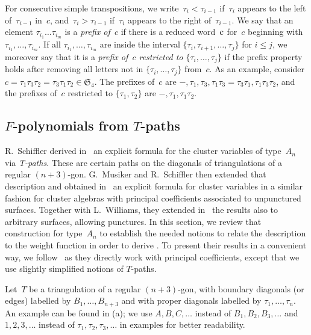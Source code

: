 \documentclass[ALCO,Unicode,ThmDefs]{cedram}
\newcommand{\Sym}{{\mathfrak{S}}}
\newcommand{\Dfn}[1]{\emph{#1}}
\newcommand{\sq}[1]{{\rm #1}}
\renewcommand{\c}{\sq{c}}
\begin{document}
For consecutive simple transpositions, we write~$\tau_i < \tau_{i-1}$ if~$\tau_i$ appears to the left of~$\tau_{i-1}$ in~$c$, and~$\tau_i > \tau_{i-1}$ if~$\tau_i$ appears to the right of~$\tau_{i-1}$. We say that an element $\tau_{i_1} \dots \tau_{i_m}$ is a \Dfn{prefix of~$c$} if there is a reduced word~$\c$ for~$c$ beginning with~$\tau_{i_1},\dots,\tau_{i_m}$. If all $\tau_{i_1},\dots,\tau_{i_m}$ are inside the interval $\{\tau_i,\tau_{i+1},\dots,\tau_j\}$ for $i \leq j$, we moreover say that it is a \Dfn{prefix of~$c$ restricted to $\{\tau_i,\dots,\tau_j\}$} if the prefix property holds after removing all letters not in $\{\tau_i,\dots,\tau_j\}$ from~$c$. As an example, consider $c = \tau_1\tau_3\tau_2 = \tau_3\tau_1\tau_2 \in \Sym_{4}$. The prefixes of~$c$ are $-,\tau_1,\tau_3,\tau_1\tau_3 = \tau_3\tau_1,\tau_1\tau_3\tau_2$, and the prefixes of~$c$ restricted to $\{\tau_1,\tau_2\}$ are $-,\tau_1,\tau_1\tau_2$.

\subsection{\texorpdfstring{$F$}{F}-polynomials from \texorpdfstring{$T$}{T}-paths}\label{sec:fpolystpaths}

R.~Schiffler derived in~\cite{S2008} an explicit formula for the cluster variables of type~$A_n$ via \emph{T-paths}. These are certain paths on the diagonals of triangulations of a regular $(n+3)$-gon. G.~Musiker and R.~Schiffler then extended that description and obtained in~\cite{MS2010} an explicit formula for cluster variables in a similar fashion for cluster algebras with principal coefficients associated to unpunctured surfaces. Together with L.~Williams, they extended in~\cite{MSW2011} the results also to arbitrary surfaces, allowing punctures. In this section, we review that construction for type~$A_n$ to establish the needed notions to relate the description to the weight function in order to derive . To present their results in a convenient way, we follow~\cite[Section~5]{MS2010} as they directly work with principal coefficients, except that we use slightly simplified notions of $T$-paths.


Let~$T$ be a triangulation of a regular $(n+3)$-gon, with boundary diagonals (or edges) labelled by $B_1,\dots,B_{n+3}$ and with proper diagonals labelled by $\tau_1,\dots,\tau_n$. An example can be found in (a); we use $A,B,C,\dots$ instead of $B_1,B_2,B_3,\dots$ and $1,2,3,\dots$ instead of $\tau_1,\tau_2,\tau_3,\dots$ in examples for better readability.
\end{document}
